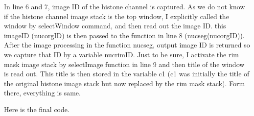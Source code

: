 In line 6 and 7, image ID of the histone channel is captured. As we do not know if the histone channel image stack is the top window, I explicitly called the window by selectWindow command, and then read out the image ID. this imageID (nucorgID) is then passed to the function in line 8 (nucseg(nucorgID)). After the image processing in the function nucseg, output image ID is returned so we capture that ID by a variable nucrimID. Just to be sure, I activate the rim mask image stack by selectImage function in line 9 and then title of the window is read out. This title is then stored in the variable c1 (c1 was initially the title of the original histone image stack but now replaced by the rim mask stack). Form there, everything is same. 

Here is the final code. 

 





 



























